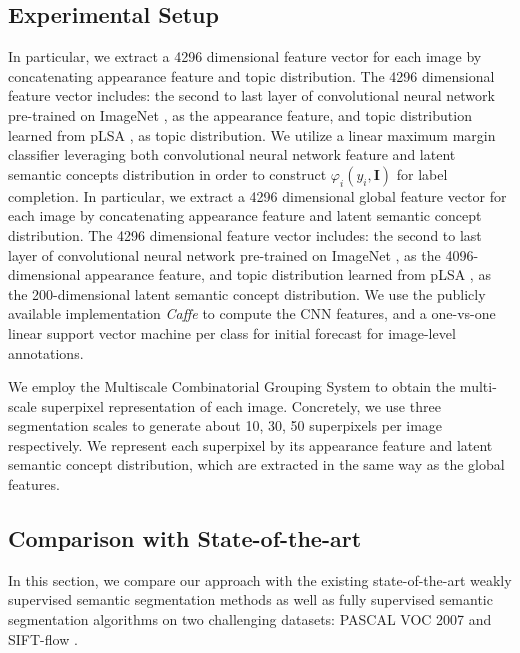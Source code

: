 \subsection{Experimental Setup}
\if
In particular, we extract a 4296 dimensional feature vector for each image by concatenating appearance feature and topic distribution. The 4296 dimensional feature vector includes: the second to last layer of convolutional neural network \cite{simonyan2014very} pre-trained on ImageNet \cite{russakovsky2014imagenet}, as the appearance feature, and topic distribution learned from pLSA \cite{hofmann1999probabilistic}, as topic distribution.
\fi
We utilize a linear maximum margin classifier leveraging both convolutional neural network feature and latent semantic concepts distribution in order to construct $\varphi_{i}(y_i,\boldsymbol{I})$ for label completion. In particular, we extract a 4296 dimensional global feature vector for each image by concatenating appearance feature and latent semantic concept distribution. The 4296 dimensional feature vector includes: the second to last layer of convolutional neural network \cite{simonyan2014very} pre-trained on ImageNet \cite{russakovsky2014imagenet}, as the 4096-dimensional appearance feature, and topic distribution learned from pLSA \cite{hofmann1999probabilistic}, as the 200-dimensional latent semantic concept distribution. We use the publicly available implementation \emph{Caffe} \cite{jia2014caffe} to compute the CNN features, and a one-vs-one linear support vector machine \cite{fan2008liblinear} per class for initial forecast for image-level annotations.

We employ the Multiscale Combinatorial Grouping System \cite{arbelaez2014multiscale} to obtain the multi-scale superpixel representation of each image. Concretely, we use three segmentation scales to generate about 10, 30, 50 superpixels per image respectively. We represent each superpixel by its appearance feature and latent semantic concept distribution, which are extracted in the same way as the global features.

\subsection{Comparison with State-of-the-art}
In this section, we compare our approach with the existing state-of-the-art weakly supervised semantic segmentation methods as well as fully supervised semantic segmentation algorithms on two challenging datasets: PASCAL VOC 2007 \cite{pascal-voc-2007} and SIFT-flow \cite{liu2011nonparametric}.

